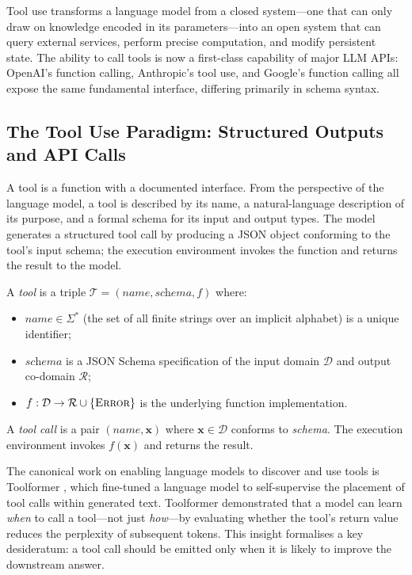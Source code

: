 \begin{deepdive}

Tool use transforms a language model from a closed system---one that can only draw on
knowledge encoded in its parameters---into an open system that can query external
services, perform precise computation, and modify persistent state. The ability to call
tools is now a first-class capability of major LLM APIs: OpenAI's function calling,
Anthropic's tool use, and Google's function calling all expose the same fundamental
interface, differing primarily in schema syntax.


\subsection{The Tool Use Paradigm: Structured Outputs and API Calls}
\label{subsec:tool-paradigm}

A tool is a function with a documented interface. From the perspective of the language
model, a tool is described by its name, a natural-language description of its purpose,
and a formal schema for its input and output types. The model generates a structured
tool call by producing a JSON object conforming to the tool's input schema; the
execution environment invokes the function and returns the result to the model.

\begin{definition}[Tool]
\label{def:tool}
A \emph{tool} is a triple $\mathcal{T} = (\textit{name}, \textit{schema}, f)$ where:
\begin{itemize}
  \item $\textit{name} \in \Sigma^*$ (the set of all finite strings over an implicit alphabet) is a unique identifier;
  \item $\textit{schema}$ is a JSON Schema specification of the input domain
        $\mathcal{D}$ and output co-domain $\mathcal{R}$;
  \item $f: \mathcal{D} \to \mathcal{R} \cup \{\textsc{Error}\}$ is the underlying
        function implementation.
\end{itemize}
A \emph{tool call} is a pair $(\textit{name}, \mathbf{x})$ where $\mathbf{x} \in
\mathcal{D}$ conforms to \textit{schema}. The execution environment invokes $f(\mathbf{x})$
and returns the result.
\end{definition}

The canonical work on enabling language models to discover and use tools is Toolformer
\cite{schick2023toolformer}, which fine-tuned a language model to self-supervise the
placement of tool calls within generated text. Toolformer demonstrated that a model can
learn \emph{when} to call a tool---not just \emph{how}---by evaluating whether the
tool's return value reduces the perplexity of subsequent tokens. This insight formalises
a key desideratum: a tool call should be emitted only when it is likely to improve the
downstream answer.


\end{deepdive}
